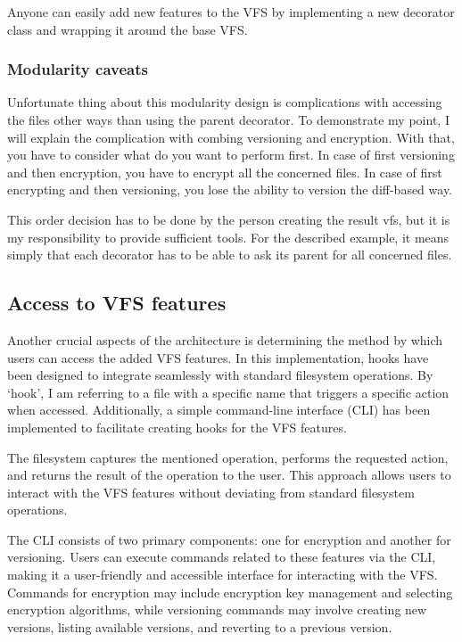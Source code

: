 Anyone can easily add new features to the VFS by implementing a new decorator class and wrapping it around the base VFS\@.

\subsubsection{Modularity caveats}\label{subsubsec:modularity-cavs}

Unfortunate thing about this modularity design is complications with accessing the files other ways than using the parent decorator.
To demonstrate my point, I will explain the complication with combing versioning and encryption.
With that, you have to consider what do you want to perform first.
In case of first versioning and then encryption, you have to encrypt all the concerned files.
In case of first encrypting and then versioning, you lose the ability to version the diff-based way.

This order decision has to be done by the person creating the result vfs, but it is my responsibility to provide sufficient tools.
For the described example, it means simply that each decorator has to be able to ask its parent for all concerned files.

\subsection{Access to VFS features}\label{subsec:access-to-vfs-features}

Another crucial aspects of the architecture is determining the method by which users can access the added VFS features.
In this implementation, hooks have been designed to integrate seamlessly with standard filesystem operations.
By `hook', I am referring to a file with a specific name that triggers a specific action when accessed.
Additionally, a simple command-line interface (CLI) has been implemented to facilitate creating hooks for the VFS features.

The filesystem captures the mentioned operation, performs the requested action, and returns the result of the operation to the user.
This approach allows users to interact with the VFS features without deviating from standard filesystem operations.

The CLI consists of two primary components: one for encryption and another for versioning.
Users can execute commands related to these features via the CLI, making it a user-friendly and accessible interface for interacting with the VFS\@.
Commands for encryption may include encryption key management and selecting encryption algorithms, while versioning commands may involve creating new versions, listing available versions, and reverting to a previous version.

